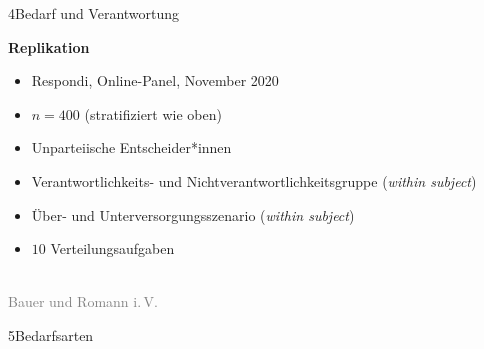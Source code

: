 \documentclass[xcolor=table,9pt,aspectratio=169]{beamer}
\begin{document}
\begin{frame}{\vspace*{10mm}4\hspace*{1em}Bedarf und Verantwortung}
\begin{multicols}{2}
   \textbf{Replikation}\\
   \medskip
   \begin{itemize}
      \item Respondi, Online-Panel, November 2020
      \item $n=400$ (stratifiziert wie oben)
      \item Unparteiische Entscheider*innen
      \item Verantwortlichkeits- und Nichtverantwortlichkeitsgruppe (\textit{within subject})
      \item Über- und Unterversorgungsszenario (\textit{within subject})
      \item $10$ Verteilungsaufgaben
   \end{itemize}
   \vfill
   \begin{center}
      \\
      \textcolor{gray}{Bauer und Romann i.\,V.}
   \end{center}
\end{multicols}
\end{frame}


\begin{frame}
\begin{overlayarea}{\textwidth}{0.81\paperheight}{
   \vspace*{11mm}
   \textcolor{uolblue}
   {5\hspace*{1em}Bedarfsarten}
}
\end{overlayarea}
\end{frame}
\end{document}
